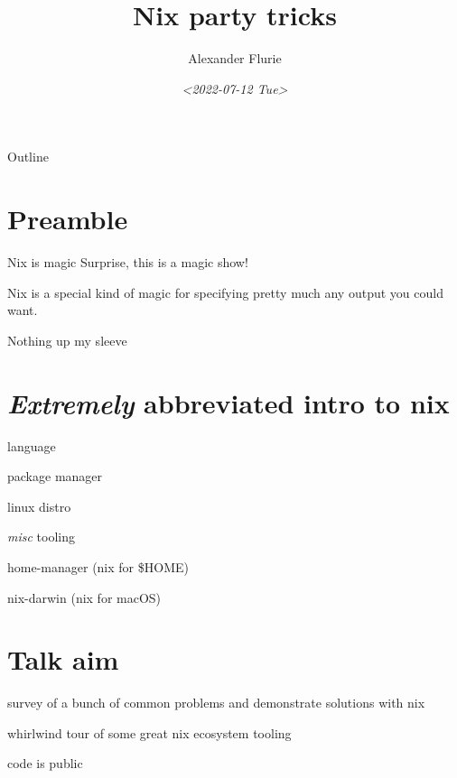 \documentclass[bigger]{beamer}
\author{Alexander Flurie}
\date{\textit{<2022-07-12 Tue>}}
\title{Nix party tricks}
\begin{document}
\maketitle
\begin{frame}{Outline}
\tableofcontents
\end{frame}


\section{Preamble}
\label{sec:org9076514}
\begin{frame}[label={sec:orgcbbaeaf}]{Nix is magic}
Surprise, this is a magic show!

Nix is a special kind of magic for specifying pretty much any output you could want.
\end{frame}
\begin{frame}[label={sec:org522b142}]{Nothing up my sleeve}
\end{frame}


\section{\emph{Extremely} abbreviated intro to nix}
\label{sec:org7c875ee}
\begin{frame}[label={sec:org3796989}]{language}
\end{frame}

\begin{frame}[label={sec:org6f1a791}]{package manager}
\end{frame}
\begin{frame}[label={sec:org64ed2f3}]{linux distro}
\end{frame}
\begin{frame}[label={sec:org8e8e9af}]{\emph{misc} tooling}
\begin{block}{home-manager (nix for \$HOME)}
\end{block}
\begin{block}{nix-darwin (nix for macOS)}
\end{block}
\end{frame}
\section{Talk aim}
\label{sec:org15e428e}
\begin{frame}[label={sec:org16b8ab0}]{survey of a bunch of common problems and demonstrate solutions with nix}
\end{frame}
\begin{frame}[label={sec:orgea4cb7b}]{whirlwind tour of some great nix ecosystem tooling}
\end{frame}
\begin{frame}[label={sec:orgddadf8b}]{code is public}
\end{frame}
\end{document}
